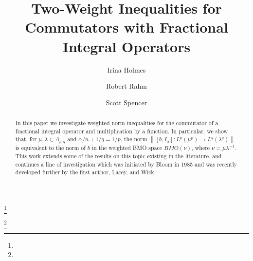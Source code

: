 \documentclass[12pt]{amsart}
\begin{document}
\makeatletter

										

\makeatother


\newtheorem{thm}{Theorem}[section]
\newtheorem{lm}[thm]{Lemma}
\newtheorem{cor}[thm]{Corollary}
\newtheorem{conj}[thm]{Conjecture}
\newtheorem{prob}[thm]{Problem}
\newtheorem{prop}[thm]{Proposition}
\newtheorem*{prop*}{Proposition}

\theoremstyle{remark}
\newtheorem{rem}[thm]{Remark}
\newtheorem*{rem*}{Remark}

\title[Commutators with Fractional Integral Operators]
{Two-Weight Inequalities for Commutators with Fractional Integral Operators}

\author{Irina Holmes}
\address{Irina Holmes, School of Mathematics\\ Georgia Institute of Technology\\ 686 Cherry Street\\ Atlanta, GA USA 30332-0160}

\author{Robert Rahm}
\address{Robert Rahm, School of Mathematics\\ Washington University in St. Louis\\
  One Brookings Drive\\ St. Louis, MO USA 63130}
\thanks{}

\author{Scott Spencer}
\address{Scott Spencer, School of Mathematics\\ Georgia Institute of Technology\\ 686 Cherry Street\\ Atlanta, GA USA 30332-0160}
\thanks{}


\begin{abstract} 
In this paper we investigate weighted norm inequalities for the commutator of a fractional integral operator 
and multiplication by a function. In particular, we show that,
for $\mu,\lambda\in A_{p,q}$ and $\alpha/n+1/q=1/p$, the norm 
${\ensuremath{\left\|{[b,I_\alpha]:L^p(\mu^p)\to L^q(\lambda^q)}\right\|}}$ is equivalent to the norm of $b$ in the weighted BMO space 
$BMO(\nu)$, where $\nu=\mu\lambda^{-1}$. This work extends some of the results on this topic existing in the literature,
and continues a line of investigation which was initiated 
by Bloom in 1985 and was recently developed further by the first author, Lacey, and Wick.

\end{abstract}
\end{document}
